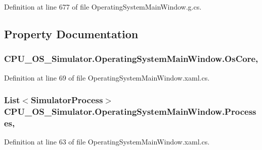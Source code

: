 Definition at line 677 of file Operating\+System\+Main\+Window.\+g.\+cs.



\subsection{Property Documentation}
\hypertarget{class_c_p_u___o_s___simulator_1_1_operating_system_main_window_ad714e0ed6e880516f8afc3f1531a2d14}{}
\subsubsection[{Os\+Core}]{ C\+P\+U\+\_\+\+O\+S\+\_\+\+Simulator.\+Operating\+System\+Main\+Window.\+Os\+Core\hspace{0.3cm}{\ttfamily [get]}, {\ttfamily [set]}}\label{class_c_p_u___o_s___simulator_1_1_operating_system_main_window_ad714e0ed6e880516f8afc3f1531a2d14}


Definition at line 69 of file Operating\+System\+Main\+Window.\+xaml.\+cs.

\hypertarget{class_c_p_u___o_s___simulator_1_1_operating_system_main_window_aadbbb1f580d767211e180a95ec71b849}{}
\subsubsection[{Processes}]{\setlength{\rightskip}{0pt plus 5cm}List$<${\bf Simulator\+Process}$>$ C\+P\+U\+\_\+\+O\+S\+\_\+\+Simulator.\+Operating\+System\+Main\+Window.\+Processes\hspace{0.3cm}{\ttfamily [get]}, {\ttfamily [set]}}\label{class_c_p_u___o_s___simulator_1_1_operating_system_main_window_aadbbb1f580d767211e180a95ec71b849}


Definition at line 63 of file Operating\+System\+Main\+Window.\+xaml.\+cs.



